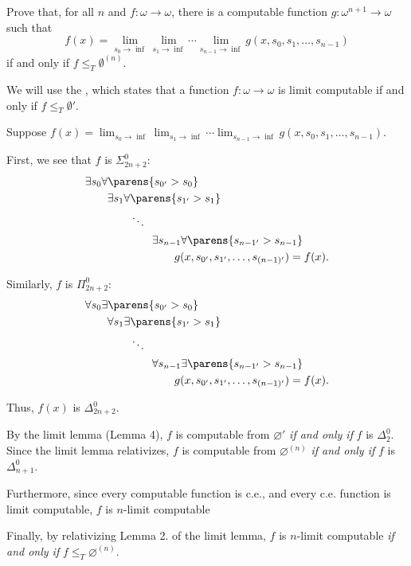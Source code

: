 \begin{problem}
  Prove that, for all $n$ and $f : \omega \to \omega$,
  there is a computable function $g : \omega^{n+1} \to \omega$
  such that
  \[
    f(x) =
      \lim_{s_0 \to \inf}
      \lim_{s_1 \to \inf}
      \cdots
      \lim_{s_{n-1} \to \inf}
      g(x, s_0, s_1, \ldots, s_{n-1})
  \]
  if and only if $f \leq_T \emptyset^{(n)}$.

  \begin{answer}
    We will use the ,
    which states that a function $f : \omega \to \omega$
    is limit computable if and only if $f \leq_T \emptyset'$.
    
    Suppose
    $\displaystyle f(x) = \lim_{s_0 \to \inf} \lim_{s_1 \to \inf} \cdots \lim_{s_{n-1} \to \inf} g(x, s_0, s_1, \ldots, s_{n-1})$.

    First, we see that $f$ is $\Sigma^0_{2n+2}$:
    \begin{alignat*}{10}
      &\exists s_0 \forall \parens{s_{0'} > s_0} \\
      &\qquad \exists s_1 \forall \parens{s_{1'} > s_1} \\
      &\qquad \qquad \ddots \\
      &\qquad \qquad \qquad \exists s_{n-1} \forall \parens{s_{n-1'} > s_{n-1}} \\
      &\qquad \qquad \qquad \qquad g(x, s_{0'}, s_{1'}, \ldots, s_{(n-1)'}) = f(x).
    \end{alignat*}

    \step
    Similarly, $f$ is $\Pi^0_{2n+2}$:
    \begin{alignat*}{10}
      &\forall s_0 \exists \parens{s_{0'} > s_0} \\
      &\qquad \forall s_1 \exists \parens{s_{1'} > s_1} \\
      &\qquad \qquad \ddots \\
      &\qquad \qquad \qquad \forall s_{n-1} \exists \parens{s_{n-1'} > s_{n-1}} \\
      &\qquad \qquad \qquad \qquad g(x, s_{0'}, s_{1'}, \ldots, s_{(n-1)'}) = f(x).
    \end{alignat*}

    \step
    Thus, $f(x)$ is $\Delta^0_{2n+2}$.

    By the limit lemma (Lemma 4),
    $f$ is computable from $\varnothing'$
    \emph{if and only if} $f$ is $\Delta^0_2$.
    Since the limit lemma relativizes,
    $f$ is computable from $\varnothing^{(n)}$
    \emph{if and only if} $f$ is $\Delta^0_{n+1}$.

    \step
    Furthermore, since every computable function is c.e.,
    and every c.e. function is limit computable,
    $f$ is $n$-limit computable

    \step
    Finally, by relativizing Lemma 2. of the limit lemma,
    $f$ is $n$-limit computable \emph{if and only if} $f \leq_T \varnothing^{(n)}$.
  \end{answer}
\end{problem}

